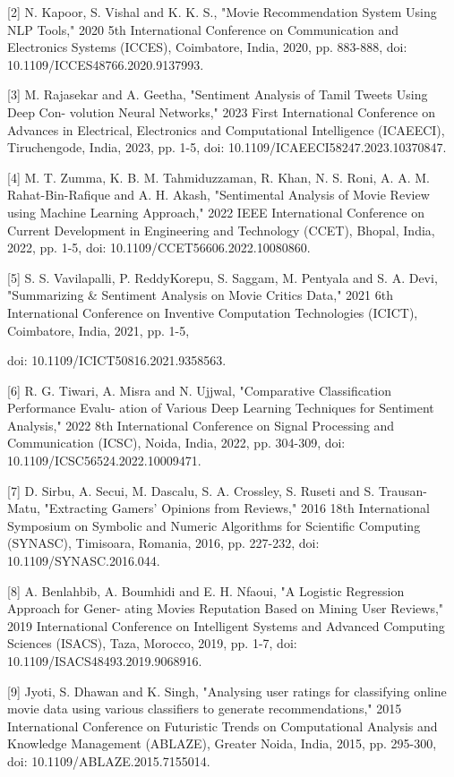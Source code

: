 \documentclass[acmlarge,nonacm,12pt]{acmart}
\begin{document}
[2] N. Kapoor, S. Vishal and K. K. S., "Movie Recommendation System Using NLP Tools," 2020 5th International Conference on Communication and Electronics Systems (ICCES), Coimbatore, India, 2020, pp. 883-888, doi: 10.1109/ICCES48766.2020.9137993.

[3] M. Rajasekar and A. Geetha, "Sentiment Analysis of Tamil Tweets Using Deep Con- volution Neural Networks," 2023 First International Conference on Advances in Electrical, Electronics and Computational Intelligence (ICAEECI), Tiruchengode, India, 2023, pp. 1-5, doi: 10.1109/ICAEECI58247.2023.10370847.

[4] M. T. Zumma, K. B. M. Tahmiduzzaman, R. Khan, N. S. Roni, A. A. M. Rahat-Bin-Rafique and A. H. Akash, "Sentimental Analysis of Movie Review using Machine Learning Approach," 2022 IEEE International Conference on Current Development in Engineering and Technology (CCET), Bhopal, India, 2022, pp. 1-5, doi: 10.1109/CCET56606.2022.10080860.

[5] S. S. Vavilapalli, P. ReddyKorepu, S. Saggam, M. Pentyala and S. A. Devi, "Summarizing \& Sentiment Analysis on Movie Critics Data," 2021 6th International Conference on Inventive Computation Technologies (ICICT), Coimbatore, India, 2021, pp. 1-5,

doi: 10.1109/ICICT50816.2021.9358563.

[6] R. G. Tiwari, A. Misra and N. Ujjwal, "Comparative Classification Performance Evalu- ation of Various Deep Learning Techniques for Sentiment Analysis," 2022 8th International Conference on Signal Processing and Communication (ICSC), Noida, India, 2022, pp. 304-309, doi: 10.1109/ICSC56524.2022.10009471.

[7] D. Sirbu, A. Secui, M. Dascalu, S. A. Crossley, S. Ruseti and S. Trausan-Matu, "Extracting Gamers’ Opinions from Reviews," 2016 18th International Symposium on Symbolic and Numeric Algorithms for Scientific Computing (SYNASC), Timisoara, Romania, 2016, pp. 227-232, doi: 10.1109/SYNASC.2016.044.

[8] A. Benlahbib, A. Boumhidi and E. H. Nfaoui, "A Logistic Regression Approach for Gener- ating Movies Reputation Based on Mining User Reviews," 2019 International Conference on Intelligent Systems and Advanced Computing Sciences (ISACS), Taza, Morocco, 2019, pp. 1-7, doi: 10.1109/ISACS48493.2019.9068916.

[9] Jyoti, S. Dhawan and K. Singh, "Analysing user ratings for classifying online movie data using various classifiers to generate recommendations," 2015 International Conference on Futuristic Trends on Computational Analysis and Knowledge Management (ABLAZE), Greater Noida, India, 2015, pp. 295-300, doi: 10.1109/ABLAZE.2015.7155014.
\end{document}
